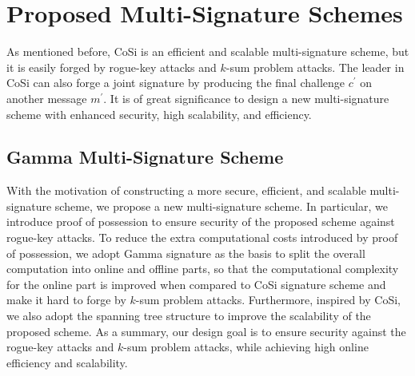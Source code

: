 \documentclass[journal]{IEEEtran}
\begin{document}
\section{Proposed Multi-Signature Schemes}
As mentioned before, CoSi is an efficient and scalable multi-signature scheme, but it is easily forged by rogue-key attacks and \(k\)-sum problem attacks. The leader in CoSi can also forge a joint signature by producing the final challenge \(c^\prime\) on another message \(m^\prime\). It is of great significance to design a new multi-signature scheme with enhanced security, high scalability, and efficiency.%

\subsection{Gamma Multi-Signature Scheme}
With the motivation of constructing a more secure, efficient, and scalable multi-signature scheme, we propose a new multi-signature scheme. In particular, we introduce proof of possession to ensure security of the proposed scheme against rogue-key attacks. To reduce the extra computational costs introduced by proof of possession, we adopt Gamma signature \cite{01DBLP:journals/tifs/YaoZ13} as the basis to split the overall computation into online and offline parts, so that the computational complexity for the online part is improved when compared to CoSi signature scheme and make it hard to forge by \(k\)-sum problem attacks. Furthermore, inspired by CoSi, we also adopt the spanning tree structure to improve the scalability of the proposed scheme. As a summary, our design goal is to ensure security against the rogue-key attacks and \(k\)-sum problem attacks, while achieving high online efficiency and scalability.
\end{document}
